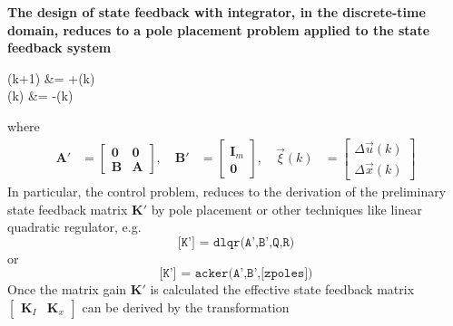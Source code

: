\documentclass[11pt,a4paper,oneside]{book}
\numberwithin{equation}{section}
\theoremstyle{it}
\theoremstyle{definition}
\begin{document}
\vspace{5mm}
\begin{mybox}
	\textbf{The design of state feedback with integrator, in the discrete-time 
		domain, reduces to a pole placement problem applied to the state feedback system}
	\begin{flalign}
		\vec{\xi}(k+1) &= \vec{\xi}+(k) \\[6pt] 
		(k) &= -\vec{\xi}(k)
	\end{flalign}
	where
	\begin{equation}
		\begin{aligned}
			\mathbf{A'} &= 
			\begin{bmatrix}
				\mathbf{0} & \mathbf{0} \\[6pt]  
				\mathbf{B} & \mathbf{A}
			\end{bmatrix}, \quad
			\mathbf{B'} &= 
			\begin{bmatrix}
				\mathbf{I}_m \\[6pt]  
				\mathbf{0}
			\end{bmatrix},	\quad
			\vec{\xi}(k) &= 
			\begin{bmatrix}
				\Delta\vec{u}(k) \\[6pt]  
				\Delta\vec{x}(k)
			\end{bmatrix}	
		\end{aligned}
	\end{equation}
	In particular, the control problem, reduces to the derivation of the preliminary state feedback matrix $\mathbf{K'}$ by pole placement or other techniques like linear quadratic regulator, e.g.
	\begin{equation}
		\texttt{[K'] = dlqr(A',B',Q,R)}
	\end{equation} 
	or
	\begin{equation}
		\texttt{[K'] = acker(A',B',[zpoles])}
	\end{equation} 
	Once the matrix gain $\mathbf{K'}$ is calculated the effective state feedback 
	matrix $\begin{bmatrix} \mathbf{K}_I & \mathbf{K}_x \end{bmatrix}$ can be derived by the transformation
	\begin{equation}

\end{equation}
\end{mybox}
\end{document}
